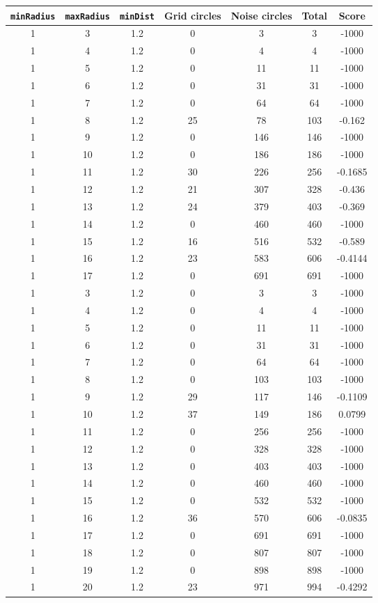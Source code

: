\documentclass[letterpaper, 12pt]{article}
\begin{document}
\begin{longtable}{|c|c|c|c|c|c|c|}
\hline
\textbf{\texttt{minRadius}} & \textbf{\texttt{maxRadius}} & \textbf{\texttt{minDist}} & \textbf{Grid circles} & \textbf{Noise circles} & \textbf{Total} & \textbf{Score} \\
\hline
1 & 3 & 1.2 & 0 & 3 & 3 & -1000 \\
\hline
1 & 4 & 1.2 & 0 & 4 & 4 & -1000 \\
\hline
1 & 5 & 1.2 & 0 & 11 & 11 & -1000 \\
\hline
1 & 6 & 1.2 & 0 & 31 & 31 & -1000 \\
\hline
1 & 7 & 1.2 & 0 & 64 & 64 & -1000 \\
\hline
1 & 8 & 1.2 & 25 & 78 & 103 & -0.162 \\
\hline
1 & 9 & 1.2 & 0 & 146 & 146 & -1000 \\
\hline
1 & 10 & 1.2 & 0 & 186 & 186 & -1000 \\
\hline
1 & 11 & 1.2 & 30 & 226 & 256 & -0.1685 \\
\hline
1 & 12 & 1.2 & 21 & 307 & 328 & -0.436 \\
\hline
1 & 13 & 1.2 & 24 & 379 & 403 & -0.369 \\
\hline
1 & 14 & 1.2 & 0 & 460 & 460 & -1000 \\
\hline
1 & 15 & 1.2 & 16 & 516 & 532 & -0.589 \\
\hline
1 & 16 & 1.2 & 23 & 583 & 606 & -0.4144 \\
\hline
1 & 17 & 1.2 & 0 & 691 & 691 & -1000 \\
\hline
1 & 3 & 1.2 & 0 & 3 & 3 & -1000 \\
\hline
1 & 4 & 1.2 & 0 & 4 & 4 & -1000 \\
\hline
1 & 5 & 1.2 & 0 & 11 & 11 & -1000 \\
\hline
1 & 6 & 1.2 & 0 & 31 & 31 & -1000 \\
\hline
1 & 7 & 1.2 & 0 & 64 & 64 & -1000 \\
\hline
1 & 8 & 1.2 & 0 & 103 & 103 & -1000 \\
\hline
1 & 9 & 1.2 & 29 & 117 & 146 & -0.1109 \\
\hline
1 & 10 & 1.2 & 37 & 149 & 186 & 0.0799 \\
\hline
1 & 11 & 1.2 & 0 & 256 & 256 & -1000 \\
\hline
1 & 12 & 1.2 & 0 & 328 & 328 & -1000 \\
\hline
1 & 13 & 1.2 & 0 & 403 & 403 & -1000 \\
\hline
1 & 14 & 1.2 & 0 & 460 & 460 & -1000 \\
\hline
1 & 15 & 1.2 & 0 & 532 & 532 & -1000 \\
\hline
1 & 16 & 1.2 & 36 & 570 & 606 & -0.0835 \\
\hline
1 & 17 & 1.2 & 0 & 691 & 691 & -1000 \\
\hline
1 & 18 & 1.2 & 0 & 807 & 807 & -1000 \\
\hline
1 & 19 & 1.2 & 0 & 898 & 898 & -1000 \\
\hline
1 & 20 & 1.2 & 23 & 971 & 994 & -0.4292 \\
\hline
\end{longtable}
\end{document}
